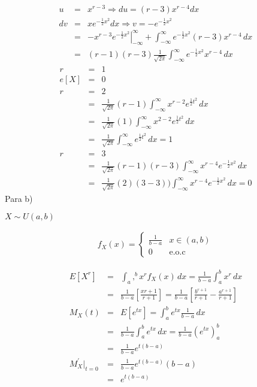 \begin{enumerate}
\begin{eqnarray*}
u &=& x^{r-3} \Rightarrow du= \left(r-3 \right)x^{r-4} dx\\
dv &=& xe^{-\frac{1}{2}  x^2} dx \Rightarrow v= -e^{-\frac{1}{2}x^2 }\\
&=&\left. -x^{r-3} e^{-\frac{1}{2}x^2} \right|_{-\infty } ^{\infty} + \int _{-\infty}^{\infty} e^{- \frac{1}{2}x^2 } \left(r-3 \right)x^{r-4} \, dx \\
&=& \left(r-1 \right) \left(r-3 \right) \frac{1}{\sqrt{2\pi}} \int _{-\infty}^{\infty} e^{- \frac{1}{2}x^2 }x^{r-4} \, dx 
\end{eqnarray*} 
\begin{eqnarray*}
r &=& 1\\ e \left[X \right] &=& 0 \\
r &=& 2 \\
&=&\frac{1}{\sqrt{2\pi}} \left(r-1 \right) \int_{-\infty }^{\infty}x^{r-2}e^{\frac{1}{2}t^2 } \, dx\\
&=& \frac{1}{\sqrt{2\pi}}\left( 1 \right)  \int_{-\infty }^{\infty}x^{2-2}e^{\frac{1}{2}t^2 } \, dx\\
&=& \frac{1}{\sqrt{2\pi}}\int_{-\infty }^{\infty}e^{\frac{1}{2}t^2 } \, dx = 1\\
r &=& 3\\
&=& \frac{1}{\sqrt{2\pi}} \left(r-1 \right) \left(r-3\right)\int_{-\infty }^{\infty } x^{r-4} e^{-\frac{1}{2}x^2 }\, dx \\
&=& \frac{1}{\sqrt{2\pi}} \left(2 \right) \left(3-3\right))\int_{-\infty }^{\infty } x^{r-4} e^{-\frac{1}{2}x^2 }\, dx = 0
\end{eqnarray*} 
Para b)


$X \sim U \left(a,b \right)$

 \begin{eqnarray*}
f_{X} \left(x \right) = \begin{cases}
\frac{1}{b-a} & x \in\left( a,b \right) \\  
0 & \textrm {e.o.c}
\end{cases}  
\end{eqnarray*}
 
\begin{eqnarray*}
E \left[X^r\right]&=& \int_{a},^{b} x^r f_{X} \left(x \right)\, dx = \frac{1}{b-a} \int_{a}^b x^r \, dx \\
&=& \frac{1}{b-a} \left[\frac{x{r+1}}{r+1} \right]= \frac{1}{b-a}\left[\frac{b^{r+1} }{r+1}- \frac{a^{r+1}}{r+1} \right]\\
M_{X}\left(t \right)&=& E \left[e^{tx}  \right]= \int_{a}^{b} e^{tx} \frac{1}{b-a} \, dx\\
&=& \frac{1}{b-a} \int _{a}^{b} e^{tx} \, dx = \frac{1}{b-a} \left(e^{tx} \right)_{a}^b\\ 
&=& \frac{1}{b-a} e^{t \left(b-a \right) } \\
M^{'}_{X}|_{t=0}&=& \frac{1}{b-a} e^{t \left(b-a \right) } \left(b-a \right)\\
&=& e^{t \left(b-a \right) }
\end{eqnarray*}


\end{enumerate}
